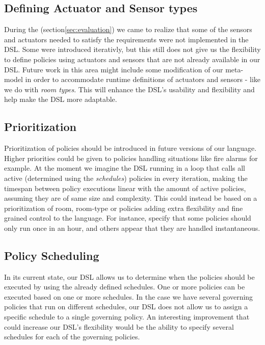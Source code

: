 \subsection{Defining Actuator and Sensor types}\label{subsec:def-sensor-actuator-types}
During the  (section\ref{sec:evaluation}) we came to realize that some of the sensors and actuators needed to satisfy the requirements were not implemented in the DSL. Some were introduced iterativly, but this still does not give us the flexibility to define policies using actuators and sensors that are not already available in our DSL. Future work in this area might include some modification of our meta-model in order to accommodate runtime definitions of actuators and sensors - like we do with \textit{room types}. This will enhance the DSL's usability and flexibility and help make the DSL more adaptable.

\subsection{Prioritization}\label{subsec:looptime}
Prioritization of policies should be introduced in future versions of our language. Higher priorities could be given to policies handling situations like fire alarms for example. At the moment we imagine the DSL running in a loop that calls all active (determined using the \textit{schedules}) policies in every iteration, making the timespan between policy executions linear with the amount of active policies, assuming they are of same size and complexity. This could instead be based on a prioritization of room, room-type or policies adding extra flexibility and fine grained control to the language. For instance, specify that some policies should only run once in an hour, and others appear that they are handled instantaneous. 

\subsection{Policy Scheduling}\label{subsec:during}
In its current state, our DSL allows us to determine when the policies should be executed by using the already defined schedules. One or more policies can be executed based on one or more schedules. In the case we have several governing policies that run on different schedules, our DSL does not allow us to assign a specific schedule to a single governing policy. An interesting improvement that could increase our DSL's flexibility would be the ability to specify several schedules for each of the governing policies.